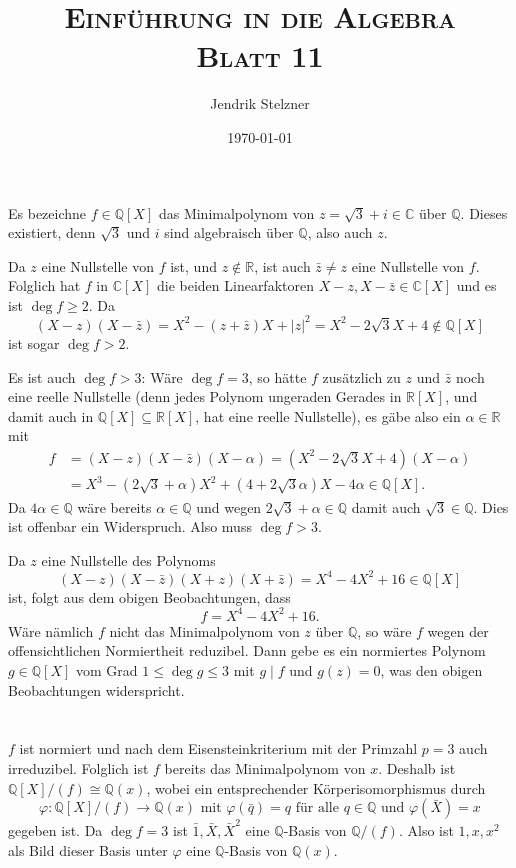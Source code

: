 \documentclass[a4paper,10pt]{article}
\title{\textsc{Einführung in die Algebra \\ \Large Blatt 11}}
\author{Jendrik Stelzner}
\date{\today}
\theoremstyle{definition}
\newcommand{\Q}{\mathbb{Q}}
\newcommand{\R}{\mathbb{R}}
\newcommand{\C}{\mathbb{C}}
\begin{document}
\maketitle





\section{}
Es bezeichne $f \in \Q[X]$ das Minimalpolynom von $z = \sqrt{3}+i \in \C$ über $\Q$. Dieses existiert, denn $\sqrt{3}$ und $i$ sind algebraisch über $\Q$, also auch $z$.

Da $z$ eine Nullstelle von $f$ ist, und $z \not\in \R$, ist auch $\bar{z} \neq z$ eine Nullstelle von $f$. Folglich hat $f$ in $\C[X]$ die beiden Linearfaktoren $X-z, X-\bar{z} \in \C[X]$ und es ist $\deg f \geq 2$. Da
\[
 (X-z)(X-\bar{z}) = X^2 -(z+\bar{z})X + |z|^2 = X^2 -2\sqrt{3}X + 4 \not\in \Q[X]
\]
ist sogar $\deg f > 2$.

Es ist auch $\deg f > 3$: Wäre $\deg f = 3$, so hätte $f$ zusätzlich zu $z$ und $\bar{z}$ noch eine reelle Nullstelle (denn jedes Polynom ungeraden Gerades in $\R[X]$, und damit auch in $\Q[X] \subseteq \R[X]$, hat eine reelle Nullstelle), es gäbe also ein $\alpha \in \R$ mit
\begin{align*}
 f &= (X-z)(X-\bar{z})(X-\alpha) = (X^2 -2\sqrt{3}X + 4)(X-\alpha) \\
   &= X^3 - (2\sqrt{3}+\alpha)X^2 + (4+2\sqrt{3}\alpha)X -4\alpha \in \Q[X].
\end{align*}
Da $4\alpha \in \Q$ wäre bereits $\alpha \in \Q$ und wegen $2\sqrt{3} + \alpha \in \Q$ damit auch $\sqrt{3} \in \Q$. Dies ist offenbar ein Widerspruch. Also muss $\deg f > 3$.

Da $z$ eine Nullstelle des Polynoms
\[
 (X-z)(X-\bar{z})(X+z)(X+\bar{z})
 = X^4 -4X^2 + 16 \in \Q[X]
\]
ist, folgt aus dem obigen Beobachtungen, dass
\[
 f = X^4 -4X^2 + 16.
\]
Wäre nämlich $f$ nicht das Minimalpolynom von $z$ über $\Q$, so wäre $f$ wegen der offensichtlichen Normiertheit reduzibel. Dann gebe es ein normiertes Polynom $g \in \Q[X]$ vom Grad $1 \leq \deg g \leq 3$ mit $g \mid f$ und $g(z) = 0$, was den obigen Beobachtungen widerspricht.





\section{}
$f$ ist normiert und nach dem Eisensteinkriterium mit der Primzahl $p = 3$ auch irreduzibel. Folglich ist $f$ bereits das Minimalpolynom von $x$. Deshalb ist $\Q[X]/(f) \cong \Q(x)$, wobei ein entsprechender Körperisomorphismus durch
\[
 \varphi: \Q[X]/(f) \rightarrow \Q(x) \text{ mit }
 \varphi(\bar{q}) = q \text{ für alle } q \in \Q \text{ und }
 \varphi(\bar{X}) = x
\]
gegeben ist. Da $\deg f = 3$ ist $\bar{1}, \bar{X}, \bar{X}^2$ eine $\Q$-Basis von $\Q/(f)$. Also ist $1, x, x^2$ als Bild dieser Basis unter $\varphi$ eine $\Q$-Basis von $\Q(x)$.
\end{document}
